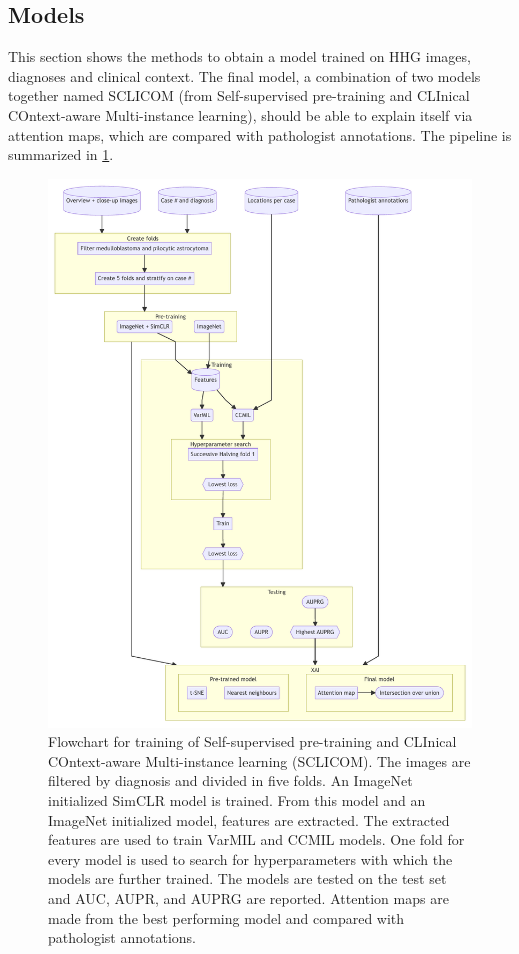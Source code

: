 \subsection{Models}
This section shows the methods to obtain a model trained on HHG images, diagnoses and clinical context.
The final model, a combination of two models together named SCLICOM (from Self-supervised pre-training and CLInical COntext-aware Multi-instance learning), should be able to explain itself via attention maps, which are compared with pathologist annotations.
The pipeline is summarized in \cref{fig:flowchart-sclicom}.

\begin{figure}
    \centering
    \includegraphics[width=\linewidth]{mermaid/brain/analytical-methods.pdf}
    \caption[Flowchart of training SCLICOM.]{
        Flowchart for training of Self-supervised pre-training and CLInical COntext-aware Multi-instance learning (SCLICOM).
        The images are filtered by diagnosis and divided in five folds.
        An ImageNet initialized SimCLR model is trained.
        From this model and an ImageNet initialized model, features are extracted.
        The extracted features are used to train VarMIL and CCMIL models.
        One fold for every model is used to search for hyperparameters with which the models are further trained.
        The models are tested on the test set and AUC, AUPR, and AUPRG are reported.
        Attention maps are made from the best performing model and compared with pathologist annotations.
    }
    \label{fig:flowchart-sclicom}
\end{figure}


